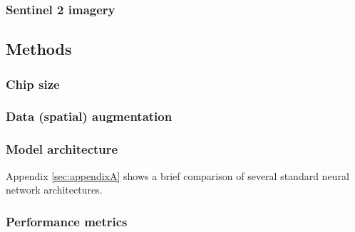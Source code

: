 



\subsubsection{Sentinel 2 imagery}

\subsection{Methods}

\subsubsection{Chip size}
\subsubsection{Data (spatial) augmentation}


\subsubsection{Model architecture}


Appendix \ref*{sec:appendixA} shows a brief comparison of several standard neural network architectures.





\subsubsection{Performance metrics}


